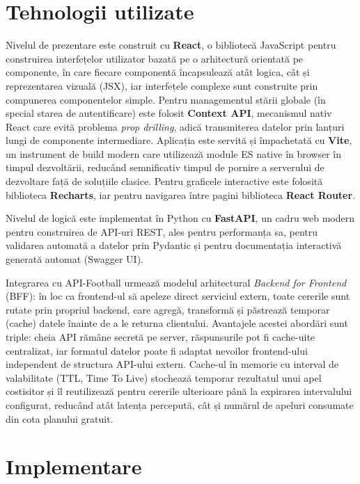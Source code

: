 \section{Tehnologii utilizate}
\label{sec:tehnologii}

Nivelul de prezentare este construit cu \textbf{React}, o bibliotecă
JavaScript pentru construirea interfețelor utilizator bazată pe o
arhitectură orientată pe componente, în care fiecare componentă încapsulează
atât logica, cât și reprezentarea vizuală (JSX), iar interfețele complexe
sunt construite prin compunerea componentelor simple. Pentru managementul
stării globale (în special starea de autentificare) este folosit
\textbf{Context API}, mecanismul nativ React care evită problema
\textit{prop drilling}, adică transmiterea datelor prin lanțuri lungi de
componente intermediare. Aplicația este servită și împachetată cu
\textbf{Vite}, un instrument de build modern care utilizează module ES
native în browser în timpul dezvoltării, reducând semnificativ timpul de
pornire a serverului de dezvoltare față de soluțiile clasice. Pentru
graficele interactive este folosită biblioteca \textbf{Recharts}, iar pentru
navigarea între pagini biblioteca \textbf{React Router}.

Nivelul de logică este implementat în Python cu \textbf{FastAPI}, un cadru
web modern pentru construirea de API-uri REST, ales pentru performanța sa,
pentru validarea automată a datelor prin Pydantic și pentru documentația
interactivă generată automat (Swagger UI).

Integrarea cu API-Football urmează modelul arhitectural
\textit{Backend for Frontend} (BFF): în loc ca frontend-ul să apeleze direct
serviciul extern, toate cererile sunt rutate prin propriul backend, care
agregă, transformă și păstrează temporar (cache) datele înainte de a le
returna clientului. Avantajele acestei abordări sunt triple: cheia API
rămâne secretă pe server, răspunsurile pot fi cache-uite centralizat, iar
formatul datelor poate fi adaptat nevoilor frontend-ului independent de
structura API-ului extern. Cache-ul în memorie cu interval de valabilitate
(TTL, Time To Live) stochează temporar rezultatul unui apel costisitor și îl
reutilizează pentru cererile ulterioare până la expirarea intervalului
configurat, reducând atât latența percepută, cât și numărul de apeluri
consumate din cota planului gratuit.

\section{Implementare}
\label{sec:implementation}

